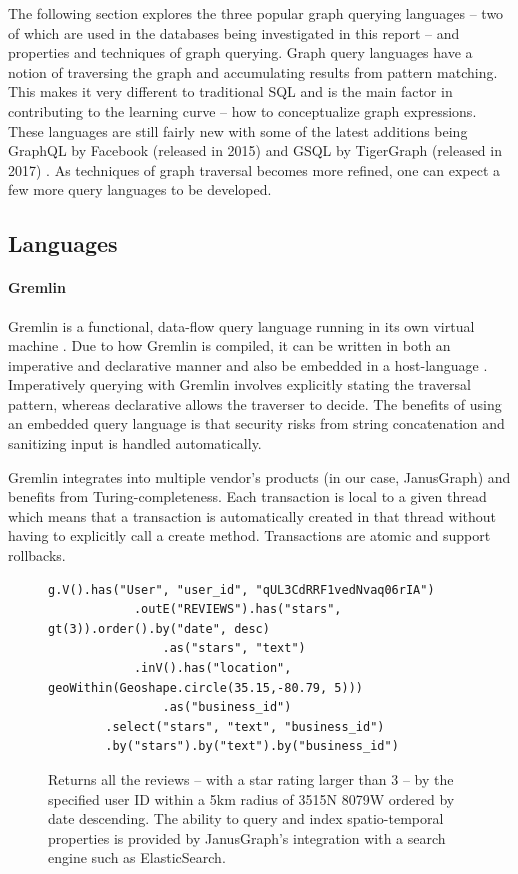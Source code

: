 The following section explores the three popular graph querying languages -- two of which are used in the databases being investigated in this report -- and properties and techniques of graph querying. Graph query languages have a notion of traversing the graph and accumulating results from pattern matching. This makes it very different to traditional SQL and is the main factor in contributing to the learning curve -- how to conceptualize graph expressions. These languages are still fairly new with some of the latest additions being GraphQL by Facebook (released in 2015) \cite{graphqlhome} and GSQL by TigerGraph (released in 2017) \cite{tgv1docs}. As techniques of graph traversal becomes more refined, one can expect a few more query languages to be developed.

\subsection{Languages}
\label{subsec:lang}

\paragraph{Gremlin}

Gremlin is a functional, data-flow query language running in its own virtual machine \cite{gremlinTinkerpop}. Due to how Gremlin is compiled, it can be written in both an imperative and declarative manner and also be embedded in a host-language \cite{tinkerpopDocs}. Imperatively querying with Gremlin involves explicitly stating the traversal pattern, whereas declarative allows the traverser to decide. The benefits of using an embedded query language is that security risks from string concatenation and sanitizing input is handled automatically.

Gremlin integrates into multiple vendor's products (in our case, JanusGraph) and benefits from Turing-completeness. Each transaction is local to a given thread which means that a transaction is automatically created in that thread without having to explicitly call a create method. Transactions are atomic and support rollbacks.

\begin{figure}[h]
    \centering
    \begin{lstlisting}[language=gremlin]
    g.V().has("User", "user_id", "qUL3CdRRF1vedNvaq06rIA")
            .outE("REVIEWS").has("stars", gt(3)).order().by("date", desc)
                .as("stars", "text")
            .inV().has("location", geoWithin(Geoshape.circle(35.15,-80.79, 5)))
                .as("business_id")
        .select("stars", "text", "business_id")
        .by("stars").by("text").by("business_id")
    \end{lstlisting}
    \caption{Returns all the reviews -- with a star rating larger than 3 -- by the specified user ID within a 5km radius of 35\degree 15N 80\degree 79W ordered by date descending. The ability to query and index spatio-temporal properties is provided by JanusGraph's integration with a search engine such as ElasticSearch.}
    \label{lst:gremlinExample1}
\end{figure}

